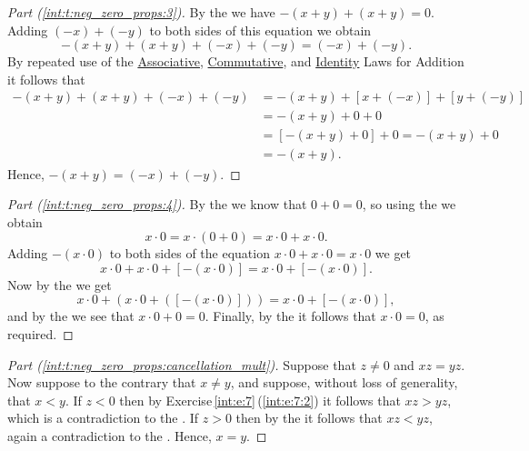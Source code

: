 \begin{proof}[Part (\ref{int:t:neg_zero_props:3})]
	By the  we have $-(x + y) + (x + y) = 0$. Adding $(-x) + (-y)$ to both sides of this equation we obtain \[
		-(x + y) + (x + y) + (-x) + (-y) = (-x) + (-y).
	\] By repeated use of the \hyperref[int:t:props:associative_add]{Associative}, \hyperref[int:t:props:commutative_add]{Commutative}, and \hyperref[int:t:props:identity_add]{Identity} Laws for Addition it follows that
	\begin{align*}
		-(x + y) + (x + y) + (-x) + (-y) & = -(x + y) + [x + (-x)] + [y + (-y)] \\
		                                 & = -(x + y) + 0 + 0                   \\
		                                 & = [-(x + y) + 0] + 0 = -(x + y) + 0  \\
		                                 & = -(x + y).
	\end{align*}
	Hence, $-(x + y) = (-x) + (-y)$.
\end{proof}

\begin{proof}[Part (\ref{int:t:neg_zero_props:4})]
	By the  we know that $0 + 0 = 0$, so using the  we obtain
	\[
		x \cdot 0 = x \cdot (0 + 0) = x \cdot 0 + x \cdot 0.
	\]
	Adding $-(x \cdot 0)$ to both sides of the equation $x \cdot 0 + x \cdot 0 = x \cdot 0$ we get
	\[
		x \cdot 0 + x \cdot 0 + [-(x \cdot 0)] = x \cdot 0 + [-(x \cdot 0)].
	\]
	Now by the  we get
	\[
		x \cdot 0 + (x \cdot 0 + ([-(x \cdot 0)])) = x \cdot 0 + [-(x \cdot 0)],
	\]
	and by the  we see that $x \cdot 0 + 0 = 0$. Finally, by the  it follows that $x \cdot 0 = 0$, as required.
\end{proof}

\begin{proof}[Part (\ref{int:t:neg_zero_props:cancellation_mult})]
	Suppose that $z \not= 0$ and $xz = yz$. Now suppose to the contrary that ${x \not= y}$, and suppose, without loss of generality, that $x < y$. If $z < 0$ then by Exercise\,\ref{int:e:7}\,(\ref{int:e:7:2}) it follows that $xz > yz$, which is a contradiction to the . If $z > 0$ then by the  it follows that $xz < yz$, again a contradiction to the . Hence, $x = y$.
\end{proof}

